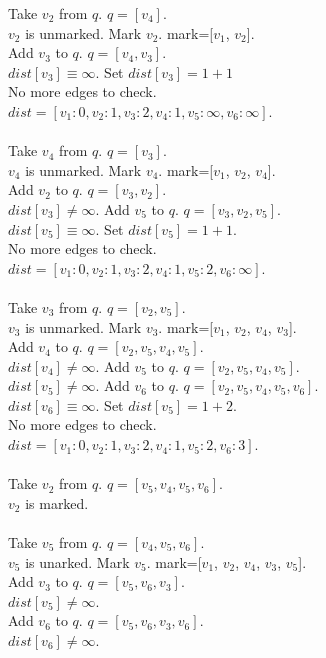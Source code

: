 \documentclass[11pt,a4paper]{article}
\begin{document}
Take $v_2$ from $q$. $q=[v_4]$.\\
$v_2$ is unmarked. Mark $v_2$. mark=[$v_1$, $v_2$].\\
Add $v_3$ to $q$. $q=[v_4, v_3]$.\\
$dist[v_3]\equiv\infty$. Set $dist[v_3]=1+1$\\
No more edges to check.\\
$dist=[v_1:0,v_2:1,v_3:2,v_4:1,v_5:\infty,v_6:\infty]$.\\
\\
Take $v_4$ from $q$. $q=[v_3]$.\\
$v_4$ is unmarked. Mark $v_4$.  mark=[$v_1$, $v_2$, $v_4$].\\
Add $v_2$ to $q$. $q=[v_3, v_2]$.\\
$dist[v_3]\neq\infty$.
Add $v_5$ to $q$. $q=[v_3, v_2, v_5]$.\\
$dist[v_5]\equiv\infty$. Set $dist[v_5]=1+1$.\\
No more edges to check.\\
$dist=[v_1:0,v_2:1,v_3:2,v_4:1,v_5:2,v_6:\infty]$.\\
\\
Take $v_3$ from $q$. $q=[v_2,v_5]$.\\
$v_3$ is unmarked. Mark $v_3$.  mark=[$v_1$, $v_2$, $v_4$, $v_3$].\\
Add $v_4$ to $q$. $q=[v_2, v_5, v_4,v_5]$.\\
$dist[v_4]\neq\infty$.
Add $v_5$ to $q$. $q=[v_2, v_5,v_4, v_5]$.\\
$dist[v_5]\neq\infty$.
Add $v_6$ to $q$. $q=[v_2, v_5,v_4, v_5, v_6]$.\\
$dist[v_6]\equiv\infty$. Set $dist[v_5]=1+2$.\\
No more edges to check.\\
$dist=[v_1:0,v_2:1,v_3:2,v_4:1,v_5:2,v_6:3]$.\\
\\
Take $v_2$ from $q$. $q=[v_5,v_4, v_5, v_6]$.\\
$v_2$ is marked.\\
\\
Take $v_5$ from $q$. $q=[v_4, v_5, v_6]$.\\
$v_5$ is unarked. Mark $v_5$. mark=[$v_1$, $v_2$, $v_4$, $v_3$, $v_5$].\\
Add $v_3$ to $q$. $q=[v_5,v_6,v_3]$.\\
$dist[v_5]\neq\infty$.\\
Add $v_6$ to $q$. $q=[v_5,v_6,v_3,v_6]$.\\
$dist[v_6]\neq\infty$.\\
\end{document}
